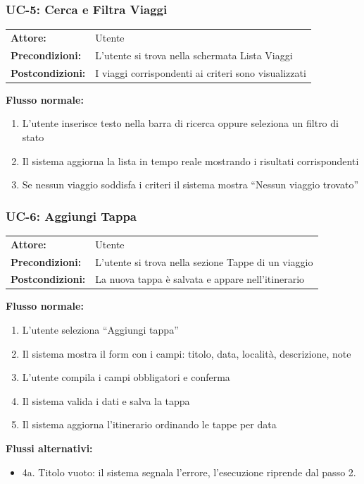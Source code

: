 \documentclass[12pt, a4paper]{article}
\makeatletter
\newcommand{\ucblock}[3]{%
  \noindent
  \begin{tabular}{@{}ll@{}}
    \textbf{Attore:}         & #1 \\
    \textbf{Precondizioni:}  & #2 \\
    \textbf{Postcondizioni:} & #3 \\
  \end{tabular}%
  \medskip
}
\makeatother
\begin{document}
\subsubsection{UC-5: Cerca e Filtra Viaggi}

\ucblock{Utente}{L'utente si trova nella schermata Lista Viaggi}{I viaggi corrispondenti ai criteri sono visualizzati}

\noindent\textbf{Flusso normale:}
\begin{enumerate}[leftmargin=1.5em, itemsep=1pt]
  \item L'utente inserisce testo nella barra di ricerca oppure seleziona un filtro di stato
  \item Il sistema aggiorna la lista in tempo reale mostrando i risultati corrispondenti
  \item Se nessun viaggio soddisfa i criteri il sistema mostra ``Nessun viaggio trovato''
\end{enumerate}

\subsubsection{UC-6: Aggiungi Tappa}

\ucblock{Utente}{L'utente si trova nella sezione Tappe di un viaggio}{La nuova tappa è salvata e appare nell'itinerario}

\noindent\textbf{Flusso normale:}
\begin{enumerate}[leftmargin=1.5em, itemsep=1pt]
  \item L'utente seleziona ``Aggiungi tappa''
  \item Il sistema mostra il form con i campi: titolo, data, località, descrizione, note
  \item L'utente compila i campi obbligatori e conferma
  \item Il sistema valida i dati e salva la tappa
  \item Il sistema aggiorna l'itinerario ordinando le tappe per data
\end{enumerate}

\noindent\textbf{Flussi alternativi:}
\begin{itemize}[leftmargin=1.5em, itemsep=1pt]
  \item 4a. Titolo vuoto: il sistema segnala l'errore, l'esecuzione riprende dal passo 2.
\end{itemize}
\end{document}
